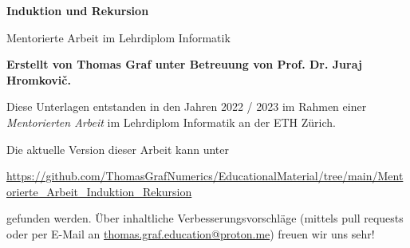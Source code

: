 \begin{titlepage}
    \thispagestyle{empty}
    \begin{center}
        \vspace*{1cm}
            
        {\Huge
        \textbf{Induktion und Rekursion}
            
        \vspace{0.5cm}
        \LARGE
        Mentorierte Arbeit im Lehrdiplom Informatik
            
        \vspace{1.5cm}
            
        \textbf{Erstellt von Thomas Graf unter Betreuung von Prof. Dr. Juraj Hromkovič.}
        }
        \vfill
        \clearpage
        \thispagestyle{empty}
        \mbox{}
        \vfill
        {\Large Diese Unterlagen entstanden in den Jahren 2022 / 2023 im Rahmen einer \textit{Mentorierten Arbeit} im Lehrdiplom Informatik an der ETH Zürich.}

        \noindent
        Die aktuelle Version dieser Arbeit kann unter
        \begin{center}
            {\footnotesize
                \url{https://github.com/ThomasGrafNumerics/EducationalMaterial/tree/main/Mentorierte_Arbeit_Induktion_Rekursion}
            }
        \end{center}
        gefunden werden. Über inhaltliche Verbesserungsvorschläge (mittels pull requests oder per E-Mail an \href{mailto:thomas.graf.education@proton.me}{thomas.graf.education@proton.me}) freuen wir uns sehr!
        \vspace{0.8cm}
    \end{center}
\end{titlepage}
